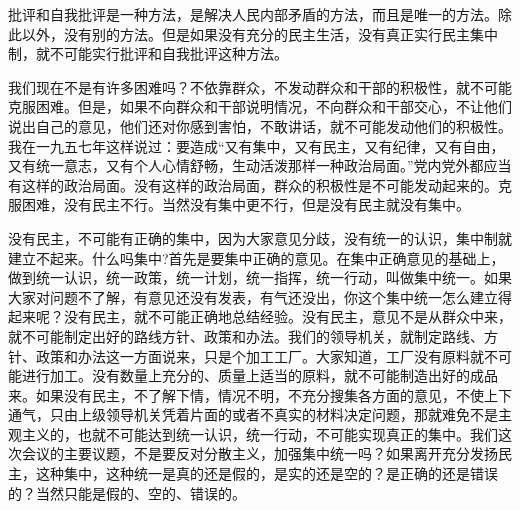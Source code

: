 批评和自我批评是一种方法，是解决人民内部矛盾的方法，而且是唯一的方法。除此以外，没有别的方法。但是如果没有充分的民主生活，没有真正实行民主集中制，就不可能实行批评和自我批评这种方法。

我们现在不是有许多困难吗？不依靠群众，不发动群众和干部的积极性，就不可能克服困难。但是，如果不向群众和干部说明情况，不向群众和干部交心，不让他们说出自己的意见，他们还对你感到害怕，不敢讲话，就不可能发动他们的积极性。我在一九五七年这样说过：要造成“又有集中，又有民主，又有纪律，又有自由，又有统一意志，又有个人心情舒畅，生动活泼那样一种政治局面。”党内党外都应当有这样的政治局面。没有这样的政治局面，群众的积极性是不可能发动起来的。克服困难，没有民主不行。当然没有集中更不行，但是没有民主就没有集中。

没有民主，不可能有正确的集中，因为大家意见分歧，没有统一的认识，集中制就建立不起来。什么吗集中?首先是要集中正确的意见。在集中正确意见的基础上，做到统一认识，统一政策，统一计划，统一指挥，统一行动，叫做集中统一。如果大家对问题不了解，有意见还没有发表，有气还没出，你这个集中统一怎么建立得起来呢？没有民主，就不可能正确地总结经验。没有民主，意见不是从群众中来，就不可能制定出好的路线方针、政策和办法。我们的领导机关，就制定路线、方针、政策和办法这一方面说来，只是个加工工厂。大家知道，工厂没有原料就不可能进行加工。没有数量上充分的、质量上适当的原料，就不可能制造出好的成品来。如果没有民主，不了解下情，情况不明，不充分搜集各方面的意见，不使上下通气，只由上级领导机关凭着片面的或者不真实的材料决定问题，那就难免不是主观主义的，也就不可能达到统一认识，统一行动，不可能实现真正的集中。我们这次会议的主要议题，不是要反对分散主义，加强集中统一吗？如果离开充分发扬民主，这种集中，这种统一是真的还是假的，是实的还是空的？是正确的还是错误的？当然只能是假的、空的、错误的。

